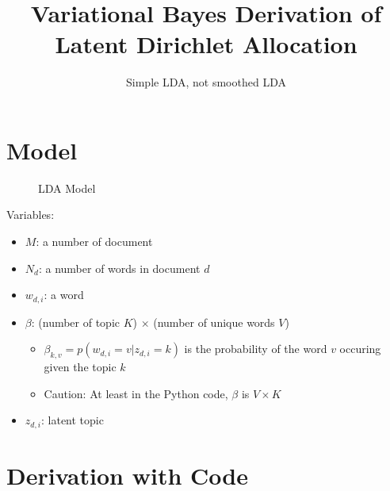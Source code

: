 \documentclass[a4paper,10.5pt,dvipdfmx]{jarticle}  %
\def\tightlist{
	\itemsep1pt
	\parskip1pt
	\parsep1pt
	\itemindent20pt
}
\begin{document}
\title{Variational Bayes Derivation of Latent Dirichlet Allocation}
\author{Simple LDA, not smoothed LDA}
\maketitle

\section{Model}
\begin{figure}[H]
\centering
{}
\caption{LDA Model}
\end{figure}
Variables:
\begin{itemize}
	\tightlist
	\item $M$: a number of document
	\item $N_d$: a number of words in document $d$
	\item $w_{d,i}$: a word
	\item $\beta$: (number of topic $K$) $\times$ (number of unique words $V$)
		\begin{itemize}
				\tightlist
			\item $\beta_{k,v} = p(w_{d,i} = v|z_{d,i}=k)$ is the probability of the word $v$ occuring given the topic $k$
			\item Caution: At least in the Python code, $\beta$ is $V \times K$
		\end{itemize}
	\item $z_{d,i}$: latent topic
\end{itemize}

\section{Derivation with Code}
\end{document}
